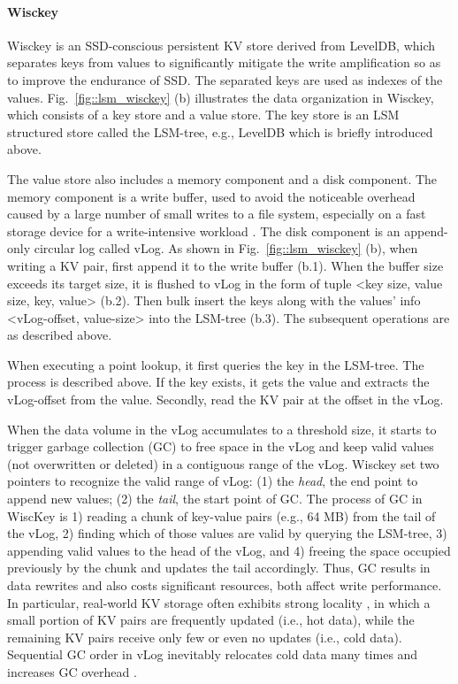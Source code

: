 \documentclass[sigconf]{acmart}
\begin{document}
\paragraph{Wisckey} Wisckey is an SSD-conscious persistent KV store derived from LevelDB, which separates keys from values to significantly mitigate the write amplification so as to improve the endurance of SSD. The separated keys are used as indexes of the values. Fig.~\ref{fig::lsm_wisckey} (b) illustrates the data organization in Wisckey, which consists of a key store and a value store. The key store is an LSM structured store called the LSM-tree, e.g., LevelDB which is briefly introduced above.

The value store also includes a memory component and a disk component. The memory component is a write buffer, used to avoid the noticeable overhead caused by a large number of small writes to a file system, especially on a fast storage device for a write-intensive workload \cite{Arrakis, Wisckey}. The disk component is an append-only circular log called vLog. As shown in Fig.~\ref{fig::lsm_wisckey} (b), when writing a KV pair, first append it to the write buffer (b.1). When the buffer size exceeds its target size, it is flushed to vLog in the form of tuple \textless key size, value size, key, value\textgreater{} (b.2). Then bulk insert the keys along with the values’ info \textless vLog-offset, value-size\textgreater{} into the LSM-tree (b.3). The subsequent operations are as described above.

When executing a point lookup, it first queries the key in the LSM-tree. The process is described above. If the key exists, it gets the value and extracts the vLog-offset from the value. Secondly, read the KV pair at the offset in the vLog.

When the data volume in the vLog accumulates to a threshold size, it starts to trigger garbage collection (GC) to free space in the vLog and keep valid values (not overwritten or deleted) in a contiguous range of the vLog. Wisckey set two pointers to recognize the valid range of vLog: (1) the \textit{head}, the end point to append new values; (2) the \textit{tail}, the start point of GC. The process of GC in WiscKey is 1) reading a chunk of key-value pairs (e.g., 64 MB) from the tail of the vLog, 2) finding which of those values are valid by querying the LSM-tree, 3) appending valid values to the head of the vLog, and 4) freeing the space occupied previously by the chunk and updates the tail accordingly. Thus, GC results in data rewrites and also costs significant resources, both affect write performance.  In particular, real-world KV storage often exhibits strong locality \cite{Workload}, in which a small portion of KV pairs are frequently updated (i.e., hot data), while the remaining KV pairs receive only few or even no updates (i.e., cold data). Sequential GC order in vLog inevitably relocates cold data many times and increases GC overhead \cite{HashKV}.
\end{document}
